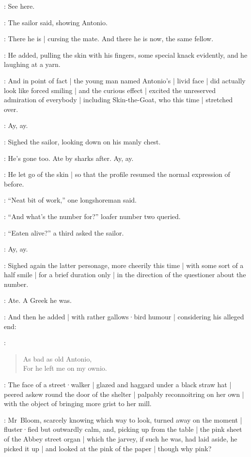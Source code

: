 \Murphy:
See here.

:
The sailor said,
showing Antonio.

\Murphy:
There he is |
cursing the mate.
And there he is now,
the same fellow.

:
He added,
pulling the skin with his fingers,
some special knack evidently,
and he laughing at a yarn.

:
And in point of fact |
the young man named Antonio's |
livid face |
did actually look like forced smiling |
and the curious effect |
excited the unreserved admiration of everybody |
including Skin-the-Goat,
who this time |
stretched over.

\Murphy:
Ay,
ay.

:
Sighed the sailor,
looking down on his manly chest.

\Murphy:
He's gone too.
Ate by sharks after.
Ay,
ay.

:
He let go of the skin |
so that the profile resumed the normal expression of before.

:
“Neat bit of work,”
one longshoreman said.

:
“And what's the number for?”
loafer number two queried.

:
“Eaten alive?”
a third asked the sailor.

\Murphy:
Ay,
ay.

:
Sighed again the latter personage,
more cheerily this time |
with some sort of a half smile |
for a brief duration only |
in the direction of the questioner about the number.

\Murphy:
Ate.
A Greek he was.

:
And then he added |
with rather gallows·bird humour |
considering his alleged end:

\Murphy:
\begin{verse}
    As bad as old Antonio,\\
    For he left me on my ownio.
\end{verse}

:
The face of a street·walker |
glazed and haggard under a black straw hat |
peered askew round the door of the shelter |
palpably reconnoitring on her own |
with the object of bringing more grist to her mill.

:
Mr~Bloom,
scarcely knowing which way to look,
turned away on the moment |
fluster·fied but outwardly calm,
and,
picking up from the table |
the pink sheet of the Abbey street organ |
which the jarvey,
if such he was,
had laid aside,
he picked it up |
and looked at the pink of the paper |
though why pink?%

